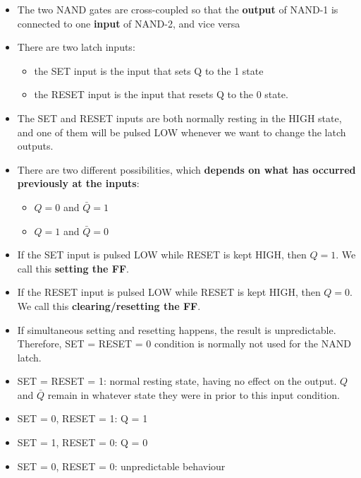     \begin{itemize}
      \item The two NAND gates are cross-coupled so that the \textbf{output} of
      NAND-1 is connected to one \textbf{input} of NAND-2, and vice versa
      \item There are two latch inputs:
      \begin{itemize}
        \item the SET input is the input that sets Q to the 1 state
        \item the RESET input is the input that resets Q to the 0 state.
      \end{itemize}
      \item The SET and RESET inputs are both normally resting in the HIGH state,
      and one of them will be pulsed LOW whenever we want to change the latch
      outputs.
      \item There are two different possibilities, which \textbf{depends on what
      has occurred previously at the inputs}:
      \begin{itemize}
        \item $Q = 0$ and $\bar{Q} = 1$
        \item $Q = 1$ and $\bar{Q} = 0$
      \end{itemize}
    \end{itemize}

    \begin{itemize}
      \item If the SET input is pulsed LOW while RESET is kept HIGH, then $Q = 1$.
      We call this \textbf{setting the FF}.
      \item If the RESET input is pulsed LOW while RESET is kept HIGH, then $Q = 0$.
      We call this \textbf{clearing/resetting the FF}.
      \item If simultaneous setting and resetting happens, the result is unpredictable.
      Therefore, SET = RESET = 0 condition is normally not used for the NAND latch.
    \end{itemize}

    \begin{itemize}
      \item SET = RESET = 1: normal resting state, having no effect on the output.
      $Q$ and $\bar{Q}$ remain in whatever state they were in prior to this input
      condition.
      \item SET = 0, RESET = 1: Q = 1
      \item SET = 1, RESET = 0: Q = 0
      \item SET = 0, RESET = 0: unpredictable behaviour
    \end{itemize}

